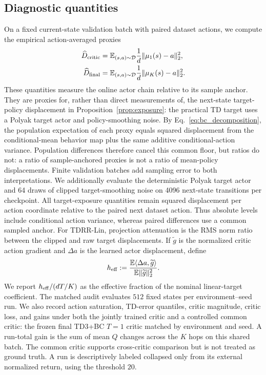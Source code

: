 \documentclass[letterpaper]{article}
\begin{document}
\subsection{Diagnostic quantities}
On a fixed current-state validation batch with paired dataset actions, we
compute the empirical action-averaged proxies
\[
\begin{aligned}
\widehat D_{\rm critic}
&=\mathbb E_{(s,a)\sim\mathcal D}\frac{1}{d}\|\mu_1(s)-a\|_2^2,\\
\widehat D_{\rm final}
&=\mathbb E_{(s,a)\sim\mathcal D}\frac{1}{d}\|\mu_K(s)-a\|_2^2.
\end{aligned}
\]
These quantities measure the online actor chain relative to its sample anchor.
They are proxies for, rather than direct measurements of, the next-state
target-policy displacement in Proposition~\ref{prop:exposure}: the practical
TD target uses a Polyak target actor and policy-smoothing noise.
By Eq.~\eqref{eq:bc_decomposition}, the population expectation of each proxy
equals squared displacement from the conditional-mean behavior map plus the
same additive conditional-action variance. Population differences therefore
cancel this common floor, but ratios do not: a ratio of sample-anchored proxies
is not a ratio of mean-policy displacements. Finite validation batches add
sampling error to both interpretations.
We additionally evaluate the deterministic Polyak target actor and 64 draws
of clipped target-smoothing noise on 4096 next-state transitions per
checkpoint. All target-exposure quantities remain squared displacement per
action coordinate relative to the paired next dataset action. Thus absolute
levels include conditional action variance, whereas paired differences use a
common sampled anchor.
For TDRR-Lin, projection attenuation is the RMS norm ratio between the clipped
and raw target displacements. If $\widetilde g$ is the normalized critic action
gradient and $\Delta a$ is the learned actor displacement, define
\[
h_{\rm eff}:=
\frac{\mathbb E\langle\Delta a,\widetilde g\rangle}
{\mathbb E\|\widetilde g\|_2^2}.
\]
We report $h_{\rm eff}/(dT/K)$ as the effective fraction of the nominal
linear-target coefficient. The matched audit evaluates $512$ fixed states per environment--seed run. We also record action saturation, TD-error quantiles, critic magnitude, critic loss, and gains under both the jointly trained critic and a controlled common critic: the frozen final TD3+BC $T=1$ critic matched by environment and seed. A run-total gain is the sum of mean $Q$ changes across the $K$ hops on this shared batch. The common critic supports cross-critic comparison but is not treated as ground truth. A run is descriptively labeled collapsed only from its external normalized return, using the threshold $20$.
\end{document}
